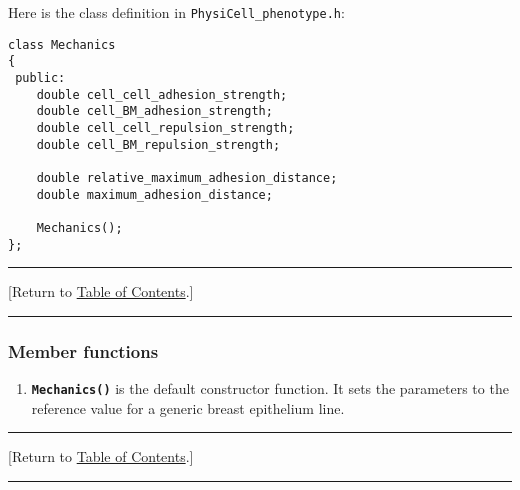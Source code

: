 \documentclass[12pt]{article}
\renewcommand{\v}{\verb}
\newcommand{\smallcode}[1]{\textbf{\texttt{#1}}}
\newcommand{\TOClink}{\begin{center}\hrule\vskip-10pt\phantom{.}\hfill[Return to \hyperlink{TOC}{Table of Contents}.]\hfill\phantom{.}\vskip3pt\hrule\end{center}}
\begin{document}
Here is the class definition in \v|PhysiCell_phenotype.h|:
\begin{verbatim}
class Mechanics
{
 public:
    double cell_cell_adhesion_strength; 
    double cell_BM_adhesion_strength;
    double cell_cell_repulsion_strength;
    double cell_BM_repulsion_strength; 
    
    double relative_maximum_adhesion_distance; 
    double maximum_adhesion_distance;
    
    Mechanics();      
};

\end{verbatim}
\TOClink

\subsubsection{Member functions}
\begin{enumerate}
\item 
\smallcode{Mechanics()} is the default constructor function. It sets the parameters to the reference value for 
a generic breast epithelium line.  
\end{enumerate}

\TOClink
\end{document}
